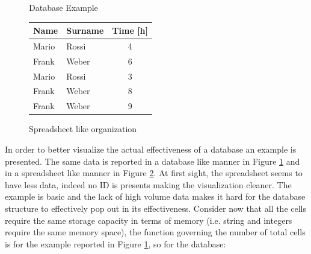 \documentclass[../main.tex]{subfiles}
\begin{document}
\begin{figure}[H]
    \centering
{}
    \caption{Database Example}
    \label{fig:dbexample}
\end{figure}
\begin{figure}[H]
\begin{center}
\begin{tabular}{ | m{2.5cm} | m{2.5cm}| c | } 
\hline
\textbf{Name} & \textbf{Surname} & \textbf{Time [h]} \\ 
\hline
Mario & Rossi & 4 \\
\hline
Frank & Weber & 6 \\
\hline
Mario & Rossi & 3 \\
\hline
Frank & Weber & 8 \\
\hline
Frank & Weber & 9 \\
\hline
\end{tabular}
\end{center}
    \caption{Spreadsheet like organization}
    \label{fig:spreadsheet}
\end{figure}
In order to better visualize the actual effectiveness of a database an example is presented. The same data is reported in a database like manner in Figure \ref{fig:dbexample} and in a spreadsheet like manner in Figure \ref{fig:spreadsheet}. At first sight, the spreadsheet seems to have less data, indeed no ID is presents making the visualization cleaner. The example is basic and the lack of high volume data makes it hard for the database structure to effectively pop out in its effectiveness. Consider now that all the cells require the same storage capacity in terms of memory (i.e. string and integers require the same memory space), the function governing the number of total cells is for the example reported in Figure \ref{fig:dbexample}, so for the database:
\end{document}
